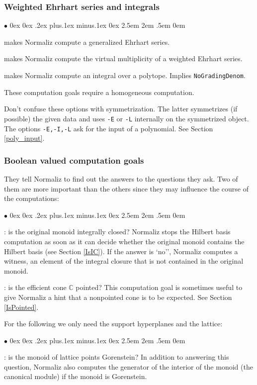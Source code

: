 \documentclass[12pt,a4paper]{scrartcl}
\newcommand{\stdli}{ \topsep0ex \partopsep0ex %
\parsep.2ex plus.1ex minus.1ex \itemsep0ex%
\leftmargin2.5em \labelwidth2em \labelsep.5em \rightmargin0em}%
\renewenvironment{itemize}{\begin{list}{{$\bullet$}}{\stdli}}{\end{list}}
\theoremstyle{definition}
\def\CC{{\mathbb C}}
\def\itemtt[#1]{\item[\textbf{\ttt{#1}}]}
\def\ttt{\texttt}
\begin{document}
\subsubsection{Weighted Ehrhart series and integrals}

\begin{itemize}
	
	\itemtt[WeightedEhrhartSeries, -E] makes Normaliz compute a generalized Ehrhart series.
	
	\itemtt[VirtualMultiplicity, -L] makes Normaliz compute the virtual multiplicity of a weighted Ehrhart series.
	
	\itemtt[Integral, -I] makes Normaliz compute an integral over a polytope. Implies \verb|NoGradingDenom|.	
\end{itemize}

These computation goals require a homogeneous computation.

Don't confuse these options with symmetrization. The latter symmetrizes (if possible) the given data and uses \verb|-E|  or \verb|-L| internally on the symmetrized object. The options \verb|-E,-I,-L| ask for the input of  a polynomial. See Section \ref{poly_input}.

\subsubsection{Boolean valued computation goals}\label{bool}

They tell Normaliz to find out the answers to the questions they ask. Two of them are more important than the others since they may influence the course of the computations:

\begin{itemize}
	\itemtt[IsIntegrallyClosed, -w]: is the original monoid integrally closed? Normaliz stops the Hilbert basis computation as soon as it can decide whether the original monoid contains the Hilbert basis (see Section \ref{IsIC}). If the answer is `no'', Normaliz computes a witness, an element of the integral closure that is not contained in the original monoid.
	
	\itemtt[IsPointed]: is the efficient cone $\CC$ pointed? This computation goal is sometimes useful to give Normaliz a hint that a nonpointed cone is to be expected. See Section \ref{IsPointed}.
\end{itemize}

For the following we only need the support hyperplanes and the lattice:

\begin{itemize}
	\itemtt[IsGorenstein, -G]: is the monoid of lattice points Gorenstein? In addition to answering this question, Normaliz also computes the generator of the interior of the monoid (the canonical module) if the monoid is Gorenstein.
\end{itemize}
\end{document}

